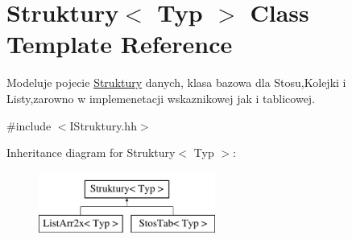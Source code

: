 \hypertarget{class_struktury}{\section{Struktury$<$ Typ $>$ Class Template Reference}
\label{class_struktury}
}


Modeluje pojecie \hyperlink{class_struktury}{Struktury} danych, klasa bazowa dla Stosu,Kolejki i Listy,zarowno w implemenetacji wskaznikowej jak i tablicowej.  




{\ttfamily \#include $<$I\-Struktury.\-hh$>$}

Inheritance diagram for Struktury$<$ Typ $>$\-:\begin{figure}[H]
\begin{center}
\leavevmode
\includegraphics[height=2.000000cm]{class_struktury}
\end{center}
\end{figure}
